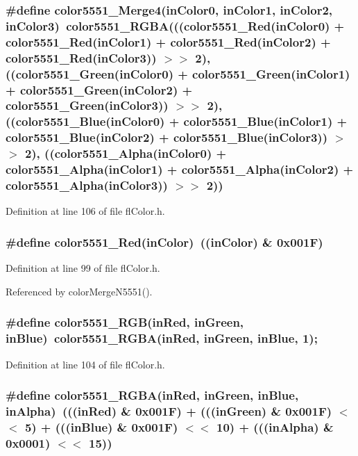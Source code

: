 \subsubsection{\setlength{\rightskip}{0pt plus 5cm}\#define color5551\_\-Merge4(in\-Color0, in\-Color1, in\-Color2, in\-Color3)~color5551\_\-RGBA(((color5551\_\-Red(in\-Color0) + color5551\_\-Red(in\-Color1) + color5551\_\-Red(in\-Color2) + color5551\_\-Red(in\-Color3)) $>$$>$ 2), ((color5551\_\-Green(in\-Color0) + color5551\_\-Green(in\-Color1) + color5551\_\-Green(in\-Color2) + color5551\_\-Green(in\-Color3)) $>$$>$ 2), ((color5551\_\-Blue(in\-Color0) + color5551\_\-Blue(in\-Color1) + color5551\_\-Blue(in\-Color2) + color5551\_\-Blue(in\-Color3)) $>$$>$ 2), ((color5551\_\-Alpha(in\-Color0) + color5551\_\-Alpha(in\-Color1) + color5551\_\-Alpha(in\-Color2) + color5551\_\-Alpha(in\-Color3)) $>$$>$ 2))}\label{flColor_8h_3c1b2b9996c4b074bc05831e97f12f0f}




Definition at line 106 of file fl\-Color.h.
\subsubsection{\setlength{\rightskip}{0pt plus 5cm}\#define color5551\_\-Red(in\-Color)~((in\-Color) \& 0x001F)}\label{flColor_8h_9f303b43fc667bb502a221e451b2c042}




Definition at line 99 of file fl\-Color.h.

Referenced by color\-Merge\-N5551().
\subsubsection{\setlength{\rightskip}{0pt plus 5cm}\#define color5551\_\-RGB(in\-Red, in\-Green, in\-Blue)~color5551\_\-RGBA(in\-Red, in\-Green, in\-Blue, 1);}\label{flColor_8h_c50680d144fda38ebea40c430e7b972c}




Definition at line 104 of file fl\-Color.h.
\subsubsection{\setlength{\rightskip}{0pt plus 5cm}\#define color5551\_\-RGBA(in\-Red, in\-Green, in\-Blue, in\-Alpha)~(((in\-Red) \& 0x001F) + (((in\-Green) \& 0x001F) $<$$<$ 5) + (((in\-Blue) \& 0x001F) $<$$<$ 10) + (((in\-Alpha) \& 0x0001) $<$$<$ 15))}\label{flColor_8h_161d1e454e1660b8f4ab1ac88764fe2b}





